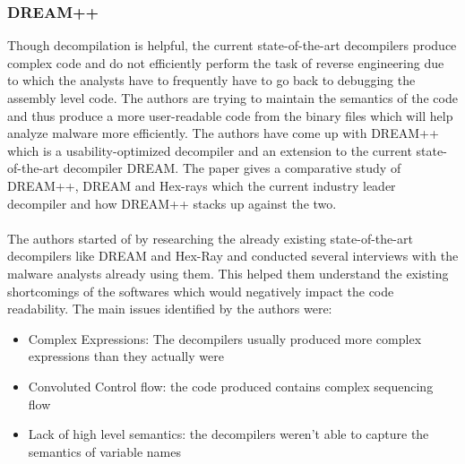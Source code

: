 \documentclass[11pt]{article}
\begin{document}
		\subsubsection{DREAM++}
		Though decompilation is helpful, the current state-of-the-art decompilers produce complex code and do not efficiently perform the task of reverse engineering due to which the analysts have to frequently have to go back to debugging the assembly level code. The authors are trying to maintain the semantics of the code and thus produce a more user-readable code from the binary files which will help analyze malware more efficiently. The authors have come up with DREAM++ which is a usability-optimized decompiler and an extension to the current state-of-the-art decompiler DREAM. The paper gives a comparative study of DREAM++, DREAM and Hex-rays which the current industry leader decompiler and how DREAM++ stacks up against the two.\\ \\
		The authors started of by researching the already existing state-of-the-art decompilers like DREAM and Hex-Ray and conducted several interviews with the malware analysts already using them. This helped them understand the existing shortcomings of the softwares which would negatively impact the code readability. The main issues identified by the authors were:
		\begin{itemize}
			\item Complex Expressions: The decompilers usually produced more complex expressions than they actually were
			\item Convoluted  Control flow: the code produced contains complex sequencing flow
			\item Lack of high level semantics: the decompilers weren’t able to capture the semantics of variable names
		\end{itemize}
\end{document}
